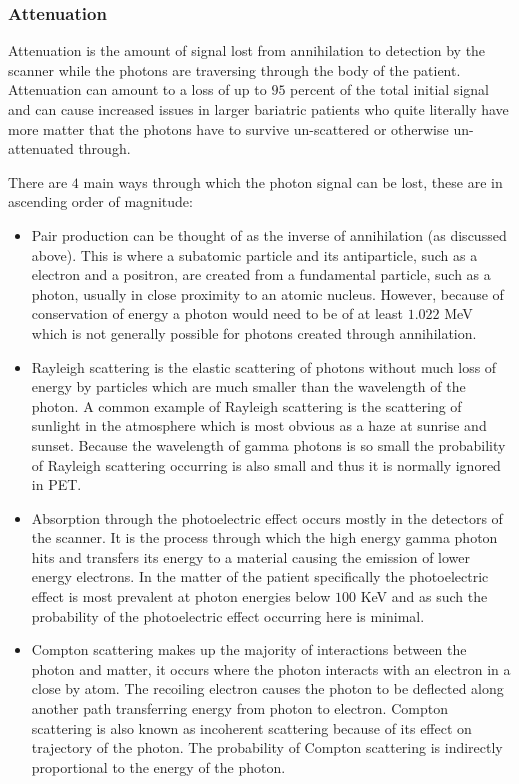             \subsubsection{Attenuation} \label{attenuation}
                Attenuation is the amount of signal lost from annihilation to detection by the scanner while the photons are traversing through the body of the patient. Attenuation can amount to a loss of up to $95$ percent of the total initial signal and can cause increased issues in larger bariatric patients who quite literally have more matter that the photons have to survive un-scattered or otherwise un-attenuated through.
                
                There are $4$ main ways through which the photon signal can be lost, these are in ascending order of magnitude:
                
                \begin{itemize}
                    \item Pair production can be thought of as the inverse of annihilation (as discussed above). This is where a subatomic particle and its antiparticle, such as a electron and a positron, are created from a fundamental particle, such as a photon, usually in close proximity to an atomic nucleus. However, because of conservation of energy a photon would need to be of at least $1.022$ \gls{MeV} which is not generally possible for photons created through annihilation.
                    
                    \item Rayleigh scattering is the elastic scattering of photons without much loss of energy by particles which are much smaller than the wavelength of the photon. A common example of Rayleigh scattering is the scattering of sunlight in the atmosphere which is most obvious as a haze at sunrise and sunset. Because the wavelength of gamma photons is so small the probability of Rayleigh scattering occurring is also small and thus it is normally ignored in \gls{PET}.
                    
                    \item Absorption through the photoelectric effect occurs mostly in the detectors of the scanner. It is the process through which the high energy gamma photon hits and transfers its energy to a material causing the emission of lower energy electrons. In the matter of the patient specifically the photoelectric effect is most prevalent at photon energies below $100$ \gls{KeV} and as such the probability of the photoelectric effect occurring here is minimal.
                    
                    \item Compton scattering makes up the majority of interactions between the photon and matter, it occurs where the photon interacts with an electron in a close by atom. The recoiling electron causes the photon to be deflected along another path transferring energy from photon to electron. Compton scattering is also known as incoherent scattering because of its effect on trajectory of the photon. The probability of Compton scattering is indirectly proportional to the energy of the photon.
                \end{itemize}
                

